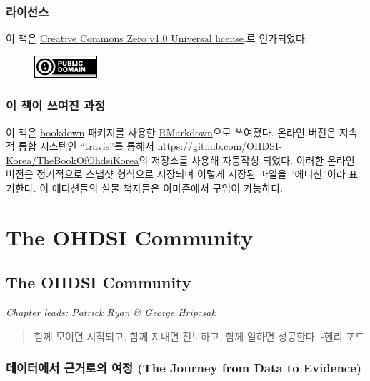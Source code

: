 \documentclass[11pt]{book}
\theoremstyle{definition}
\theoremstyle{definition}
\theoremstyle{definition}
\theoremstyle{remark}
\begin{document}
\section*{라이선스}

이 책은
\href{http://creativecommons.org/publicdomain/zero/1.0/}{Creative
Commons Zero v1.0 Universal license}.로 인가되었다.

\begin{figure}
\centering
\includegraphics{images/Preface/cc0.png}
\caption{}
\end{figure}

\section*{이 책이 쓰여진 과정}\label{---}

이 책은 \href{https://bookdown.org}{bookdown} 패키지를 사용한
\href{https://rmarkdown.rstudio.com}{RMarkdown}으로 쓰여졌다. 온라인
버전은 지속적 통합 시스템인 \href{http://travis-ci.org/}{``travis''}를
통해서 \url{https://github.com/OHDSI-Korea/TheBookOfOhdsiKorea}의
저장소를 사용해 자동작성 되었다. 이러한 온라인 버전은 정기적으로 스냅샷
형식으로 저장되며 이렇게 저장된 파일을 ``에디션''이라 표기한다. 이
에디션들의 실물 책자들은 아마존에서 구입이 가능하다.

\mainmatter

\part{The OHDSI Community}\label{part-the-ohdsi-community}

\chapter{The OHDSI Community}\label{OhdsiCommunity}

\emph{Chapter leads: Patrick Ryan \& George Hripcsak}

\begin{quote}
함께 모이면 시작되고, 함께 지내면 진보하고, 함께 일하면 성공한다. -헨리
포드
\end{quote}

\section{데이터에서 근거로의 여정 (The Journey from Data to
Evidence)}\label{---the-journey-from-data-to-evidence}
\end{document}
